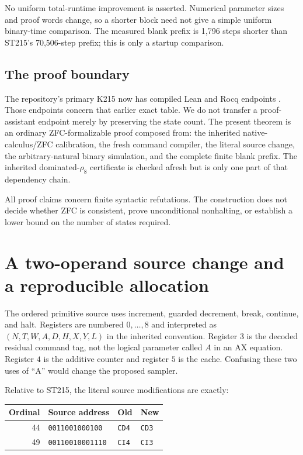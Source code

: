 \documentclass[10pt,a4paper]{article}
\begin{document}
No uniform total-runtime improvement is asserted.  Numerical parameter sizes
and proof words change, so a shorter block need not give a simple uniform
binary-time comparison.  The measured blank prefix is 1,796 steps shorter
than ST215's 70,506-step prefix; this is only a startup comparison.

\subsection{The proof boundary}

The repository's primary K215 now has compiled Lean and Rocq endpoints
\cite{k215}.  Those endpoints concern that earlier exact table.  We do not
transfer a proof-assistant endpoint merely by preserving the state count.
The present theorem is an ordinary ZFC-formalizable proof composed from:
the inherited native-calculus/ZFC calibration, the fresh command compiler,
the literal source change, the arbitrary-natural binary simulation, and the
complete finite blank prefix.  The inherited dominated-$\rho_8$ certificate
is checked afresh but is only one part of that dependency chain.

All proof claims concern finite syntactic refutations.  The construction
does not decide whether ZFC is consistent, prove unconditional nonhalting,
or establish a lower bound on the number of states required.

\section{A two-operand source change and a reproducible allocation}

The ordered primitive source uses increment, guarded decrement, break,
continue, and halt.  Registers are numbered $0,\ldots,8$ and interpreted as
$(N,T,W,A,D,H,X,Y,L)$ in the inherited convention.  Register $3$ is the
decoded residual command tag, not the logical parameter called $A$ in an
AX equation.  Register $4$ is the additive counter and register $5$ is the
cache.  Confusing these two uses of ``A'' would change the proposed sampler.

Relative to ST215, the literal source modifications are exactly:
\begin{center}
\begin{tabular}{@{}rlll@{}}
\toprule
Ordinal & Source address & Old & New\\
\midrule
44 & \texttt{0011001000100} & \texttt{CD4} & \texttt{CD3}\\
49 & \texttt{00110010001110} & \texttt{CI4} & \texttt{CI3}\\
\bottomrule
\end{tabular}
\end{center}
\end{document}
